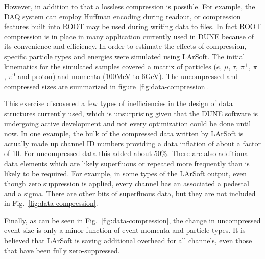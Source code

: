However, in addition to that
a lossless compression is possible. For example, the DAQ system can employ Huffman encoding
during readout, or compression features built into ROOT may be used during writing data to files.
In fact ROOT compression is in place in many application currently used in DUNE because of its
convenience and efficiency.
In order to estimate the effects of compression, specific particle types and energies were simulated using LArSoft.
The initial kinematics for the simulated samples covered a matrix of
particles ($e$, $\mu$, $\tau$, $\pi^+$, $\pi^-$, $\pi^0$ and proton) and momenta
(100MeV to 6GeV).
The uncompressed and compressed sizes are summarized in figure~\ref{fig:data-compression}.





This exercise discovered a few types of inefficiencies in the design of data structures
currently used, which is unsurprising given that the DUNE software is undergoing active development
and not every optimization could be done until now. In one example, the bulk of the
compressed data written by LArSoft is actually made up channel ID
numbers providing a data inflation of about a factor of 10.
For uncompressed data this added about 50\%.
There are also additional data elements which are likely superfluous or
repeated more frequently than is likely to be required.
For example, in some types of the LArSoft output, even though zero suppression is applied, every
channel has an associated a pedestal and a sigma. There are other bits of superfluous data, but
they are not included in Fig.~\ref{fig:data-compression}.

Finally, as can be seen in Fig.~\ref{fig:data-compression}, the change in uncompressed
event size is only a minor function of event momenta and particle types.
It is believed that LArSoft is saving additional overhead for all
channels, even those that have been fully zero-suppressed.

